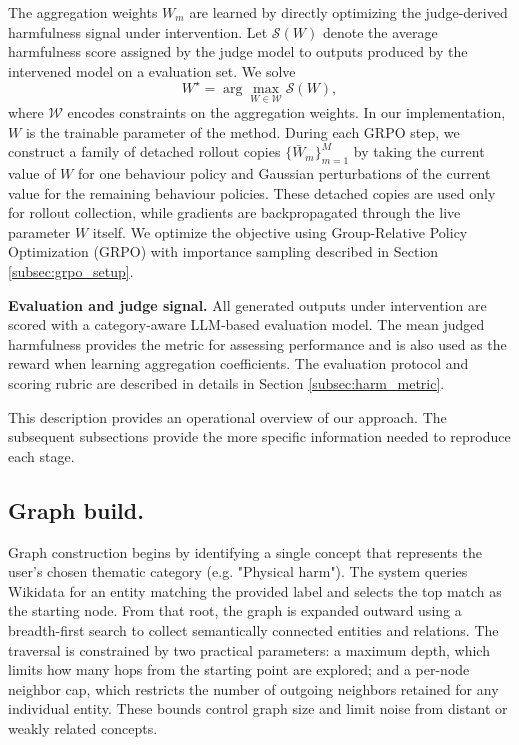 \documentclass{article}
\theoremstyle{plain}
\theoremstyle{definition}
\theoremstyle{remark}
\begin{document}
The aggregation weights $W_m$ are learned by directly optimizing the judge-derived harmfulness signal under intervention. Let $\mathcal{S}(W)$ denote the average harmfulness score assigned by the judge model to outputs produced by the intervened model on a evaluation set. We solve
\[
W^\star = \arg\max_{W\in\mathcal{W}} \mathcal{S}(W),
\]
where $\mathcal{W}$ encodes constraints on the aggregation weights. In our implementation, $W$ is the trainable parameter of the method. During each GRPO step, we construct a family of detached rollout copies $\{\bar W_m\}_{m=1}^{M}$ by taking the current value of $W$ for one behaviour policy and Gaussian perturbations of the current value for the remaining behaviour policies. These detached copies are used only for rollout collection, while gradients are backpropagated through the live parameter $W$ itself. We optimize the objective using Group-Relative Policy Optimization (GRPO) \cite{shao2024deepseekmathpushinglimitsmathematical} with importance sampling described in Section \ref{subsec:grpo_setup}.


\textbf{Evaluation and judge signal.} All generated outputs under intervention are scored with a category-aware LLM-based evaluation model. The mean judged harmfulness provides the metric for assessing performance and is also used as the reward when learning aggregation coefficients. The evaluation protocol and scoring rubric are described in details in Section \ref{subsec:harm_metric}.

This description provides an operational overview of our approach. The subsequent subsections provide the more specific information needed to reproduce each stage.

\subsection{Graph build.} \label{subsec:graph_build} 
Graph construction begins by identifying a single concept that represents the user’s chosen thematic category (e.g. "Physical harm"). The system queries Wikidata \cite{10.1145/2629489} for an entity matching the provided label and selects the top match as the starting node. From that root, the graph is expanded outward using a breadth-first search to collect semantically connected entities and relations. The traversal is constrained by two practical parameters: a maximum depth, which limits how many hops from the starting point are explored; and a per-node neighbor cap, which restricts the number of outgoing neighbors retained for any individual entity. These bounds control graph size and limit noise from distant or weakly related concepts.
\end{document}
